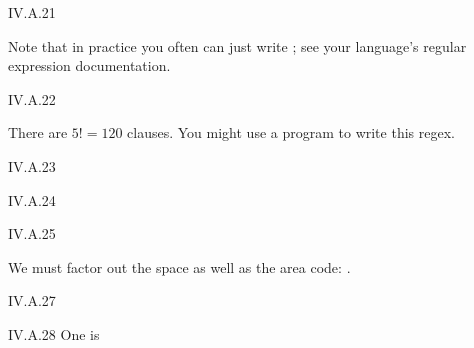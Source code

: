 %
\begin{ans}{IV.A.21}
\begin{exparts}
\item {}
Note that in practice you often can just write ; see your
language's regular expression documentation.
\item \re{[a-zA-Z0-9]*}
\item \re{[\textasciicircum]}
\end{exparts}
\end{ans}
%
\begin{ans}{IV.A.22}
\begin{exparts}
\item {}
\item {}
\item {}
\item {}
 There are $5!=120$ clauses.
 You might use a program to write this regex.
\end{exparts}
\end{ans}
%
\begin{ans}{IV.A.23}
\re{.*([.*\{|\{.*[).*}
\end{ans}
%
\begin{ans}{IV.A.24}
\end{ans}
%
\begin{ans}{IV.A.25}
\begin{exparts}
\item {}
\item We must factor out the space as well as the area code:
  .
\end{exparts}
\end{ans}
%
%
\begin{ans}{IV.A.27}
\end{ans}
%
\begin{ans}{IV.A.28}
One is 
\end{ans}
